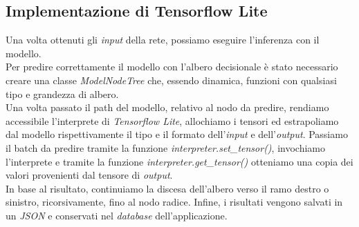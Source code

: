 \subsection{Implementazione di Tensorflow Lite}
Una volta ottenuti gli \textit{input} della rete, possiamo eseguire l'inferenza con il modello.\\ Per predire correttamente il modello con l'albero decisionale è stato necessario creare una classe \textit{ModelNodeTree} che, essendo dinamica, funzioni con qualsiasi tipo e grandezza di albero.\\
Una volta passato il path del modello, relativo al nodo da predire, rendiamo accessibile l'interprete di \textit{Tensorflow Lite}, allochiamo i tensori ed estrapoliamo dal modello rispettivamente il tipo e il formato dell'\textit{input} e dell'\textit{output}. Passiamo il batch da predire tramite la funzione \textit{interpreter.set\_tensor()}, invochiamo l'interprete e tramite la funzione \textit{interpreter.get\_tensor()} otteniamo una copia dei valori provenienti dal tensore di \textit{output}.\\
In base al risultato, continuiamo la discesa dell'albero verso il ramo destro o sinistro, ricorsivamente, fino al nodo radice.
\vspace*{2ex}
\noindent Infine, i risultati vengono salvati in un \textit{JSON} e conservati nel \textit{database} dell'applicazione.
\vspace*{2ex}
